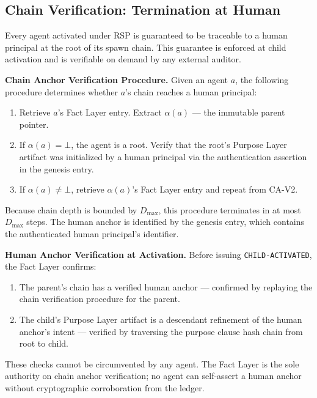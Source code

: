 \subsection{Chain Verification: Termination at Human}

Every agent activated under RSP is guaranteed to be traceable to a human principal at the root of its spawn chain. This guarantee is enforced at child activation and is verifiable on demand by any external auditor.

\bigskip
\noindent\textbf{Chain Anchor Verification Procedure.} Given an agent $a$, the following procedure determines whether $a$'s chain reaches a human principal:

\begin{enumerate}
  \item[(CA-V1)] Retrieve $a$'s Fact Layer entry. Extract $\alpha(a)$ — the immutable parent pointer.
  \item[(CA-V2)] If $\alpha(a) = \bot$, the agent is a root. Verify that the root's Purpose Layer artifact was initialized by a human principal via the authentication assertion in the genesis entry.
  \item[(CA-V3)] If $\alpha(a) \neq \bot$, retrieve $\alpha(a)$'s Fact Layer entry and repeat from CA-V2.
\end{enumerate}

Because chain depth is bounded by $D_{\max}$, this procedure terminates in at most $D_{\max}$ steps. The human anchor is identified by the genesis entry, which contains the authenticated human principal's identifier.

\bigskip
\noindent\textbf{Human Anchor Verification at Activation.} Before issuing \texttt{CHILD-ACTIVATED}, the Fact Layer confirms:

\begin{enumerate}
  \item[(HAV-1)] The parent's chain has a verified human anchor — confirmed by replaying the chain verification procedure for the parent.
  \item[(HAV-2)] The child's Purpose Layer artifact is a descendant refinement of the human anchor's intent — verified by traversing the purpose clause hash chain from root to child.
\end{enumerate}

These checks cannot be circumvented by any agent. The Fact Layer is the sole authority on chain anchor verification; no agent can self-assert a human anchor without cryptographic corroboration from the ledger.

